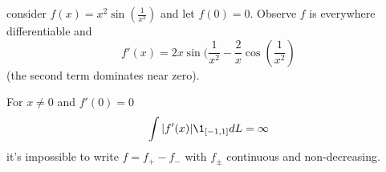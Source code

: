 \begin{example}
	consider $f(x) = x^{2} \sin(\frac{1}{x^2})$ and let $f(0) = 0$.
	Observe $f$ is everywhere differentiable and
	\[
		f'(x) = 2x \sin(\frac{1}{x^{2}} - \frac{2}{x} \cos(\frac{1}{x^2})
	\] (the second term dominates near zero).

	For $x \neq 0$ and $f'(0) = 0$
	\[
		\int | f'(x) | \1_{[-1, 1]} dL = \infty
	\] 
	it's impossible to write $f = f_{+} - f_{-}$ with $f_{\pm}$ continuous and non-decreasing.
\end{example}






